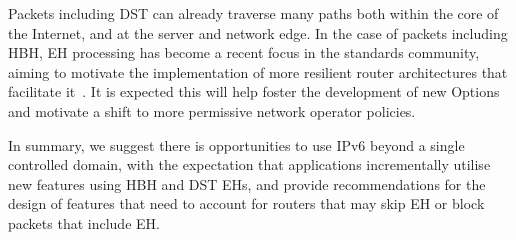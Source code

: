 \documentclass[conference]{IEEEtran}
\begin{document}
Packets including DST can already traverse many paths both within the core of the Internet, and at the server and network edge. In the case of packets including HBH, 
EH processing has become a recent focus in the standards community, aiming to motivate the implementation of more resilient router architectures that facilitate it~\cite{ietf-6man-HBH-processing-06, ietf-v6ops-HBH-03, ietf-6man-eh-limits-02}. 
It is expected this will help foster the development of new Options and motivate a shift to more permissive network operator policies.

In summary, we suggest there is opportunities to use IPv6 beyond a single controlled domain, with the
expectation that applications incrementally utilise new features using HBH and DST EHs, and provide recommendations for the design of  features that need to account for routers that may skip EH or block packets that include EH.


\small

\end{document}
